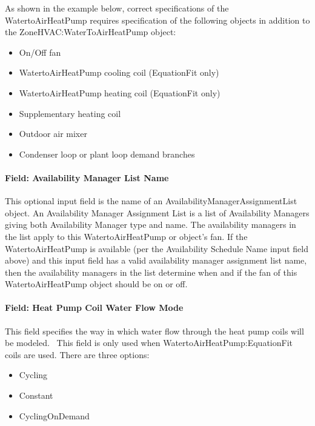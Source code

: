 As shown in the example below, correct specifications of the WatertoAirHeatPump requires specification of the following objects in addition to the ZoneHVAC:WaterToAirHeatPump object:

\begin{itemize}
\item
  On/Off fan
\item
  WatertoAirHeatPump cooling coil (EquationFit only)
\item
  WatertoAirHeatPump heating coil (EquationFit only)
\item
  Supplementary heating coil
\item
  Outdoor air mixer
\item
  Condenser loop or plant loop demand branches
\end{itemize}

\paragraph{Field: Availability Manager List Name}\label{field-availability-manager-list-name-8}

This optional input field is the name of an AvailabilityManagerAssignmentList object. An Availability Manager Assignment List is a list of Availability Managers giving both Availability Manager type and name. The availability managers in the list apply to this WatertoAirHeatPump or object's fan. If the WatertoAirHeatPump is available (per the Availability Schedule Name input field above) and this input field has a valid availability manager assignment list name, then the availability managers in the list determine when and if the fan of this WatertoAirHeatPump object should be on or off.

\paragraph{Field: Heat Pump Coil Water Flow Mode}\label{field-heat-pump-coil-water-flow-mode-001}

This field specifies the way in which water flow through the heat pump coils will be modeled.~ This field is only used when WatertoAirHeatPump:EquationFit coils are used. There are three options:

\begin{itemize}
\item
  Cycling
\item
  Constant
\item
  CyclingOnDemand
\end{itemize}

